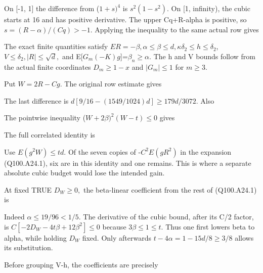 
On [-1, 1] the difference from (\(1+s)^4\) is \(s^2(1-s^2).\)
On [1, infinity), the cubic starts at 16 and has positive derivative.
The upper Cq+R-alpha is positive, so \(s=(R-\alpha)/(Cq)>-1.\)
Applying the inequality to the same actual row gives


The exact finite quantities satisfy \(ER=-\beta,\allowbreak  \alpha\le \beta\le d,\allowbreak  \kappa\delta_2\le h\le\delta_2\), \(V\le \delta_2,\allowbreak  |R|\le \sqrt{d},\allowbreak \) and
E[\(G_m(-K)g\)]=\(\beta_n\ge \alpha.\) The h and V bounds follow from the
actual finite coordinates \(D_m\ge 1-x\) and \(|G_m|\le 1\) for \(m\ge 3.\)

Put \(W=2R-Cg.\) The original row estimate gives


The last difference is
\(d[9/16-(1549/1024)d]\ge179d/3072\). Also


The pointwise inequality (\(W+2\beta)^2(W-t)\le 0\) gives


The full correlated identity is


Use \(E(g^2W)\le td.\) Of the seven copies of -\(C^2E(gR^2)\) in the
expansion (Q100.A24.1), six are in this identity and one remains. This is
where a separate absolute cubic budget would lose the intended gain.

At fixed TRUE \(D_W\ge 0,\allowbreak \) the beta-linear coefficient from the rest of
(Q100.A24.1) is


Indeed \(\alpha\le 19/96<1/5.\) The derivative of the cubic bound, after
its C/2 factor, is
\(C[-2D_W-4t\beta+12\beta^2]\le0\) because \(3\beta\le 1\le t.\)
Thus one first lowers beta to alpha, while holding \(D_W\) fixed.
Only afterwards \(t-4\alpha=1-15d/8\ge 3/8\) allows its substitution.

Before grouping V-h, the coefficients are precisely

